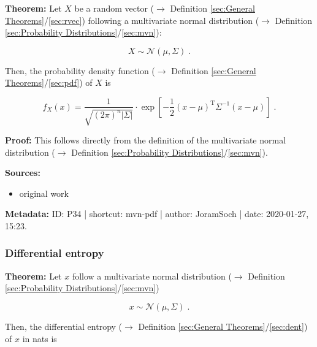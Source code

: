 \documentclass[a4paper,12pt,twoside]{book}
\begin{document}
\textbf{Theorem:} Let $X$ be a random vector ($\rightarrow$ Definition \ref{sec:General Theorems}/\ref{sec:rvec}) following a multivariate normal distribution ($\rightarrow$ Definition \ref{sec:Probability Distributions}/\ref{sec:mvn}):

\begin{equation} \label{eq:mvn-pdf-mvn}
X \sim \mathcal{N}(\mu, \Sigma) \; .
\end{equation}

Then, the probability density function ($\rightarrow$ Definition \ref{sec:General Theorems}/\ref{sec:pdf}) of $X$ is

\begin{equation} \label{eq:mvn-pdf-mvn-pdf}
f_X(x) = \frac{1}{\sqrt{(2 \pi)^n |\Sigma|}} \cdot \exp \left[ -\frac{1}{2} (x-\mu)^\mathrm{T} \Sigma^{-1} (x-\mu) \right] \; .
\end{equation}


\vspace{1em}
\textbf{Proof:} This follows directly from the definition of the multivariate normal distribution ($\rightarrow$ Definition \ref{sec:Probability Distributions}/\ref{sec:mvn}).


\vspace{1em}
\textbf{Sources:}
\begin{itemize}
\item original work\end{itemize}


\vspace{1em}
\textbf{Metadata:} ID: P34 | shortcut: mvn-pdf | author: JoramSoch | date: 2020-01-27, 15:23.
\vspace{1em}



\subsubsection[\textbf{Differential entropy}]{Differential entropy} \label{sec:mvn-dent}
\setcounter{equation}{0}

\textbf{Theorem:} Let $x$ follow a multivariate normal distribution ($\rightarrow$ Definition \ref{sec:Probability Distributions}/\ref{sec:mvn})

\begin{equation} \label{eq:mvn-dent-mvn}
x \sim \mathcal{N}(\mu, \Sigma) \; .
\end{equation}

Then, the differential entropy ($\rightarrow$ Definition \ref{sec:General Theorems}/\ref{sec:dent}) of $x$ in nats is
\end{document}
